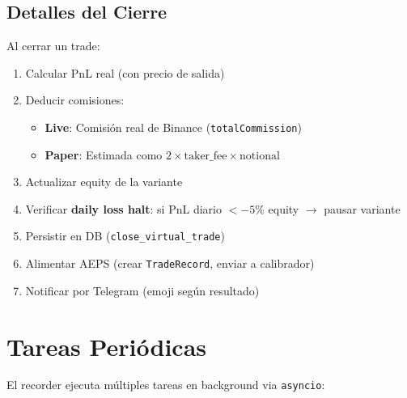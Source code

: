 \documentclass[11pt,a4paper]{article}
\newcommand{\code}[1]{\texttt{\small #1}}
\begin{document}
\subsection{Detalles del Cierre}

Al cerrar un trade:
\begin{enumerate}[leftmargin=2em]
\item Calcular PnL real (con precio de salida)
\item Deducir comisiones:
  \begin{itemize}
    \item \textbf{Live}: Comisi\'on real de Binance (\code{totalCommission})
    \item \textbf{Paper}: Estimada como $2 \times \text{taker\_fee} \times \text{notional}$
  \end{itemize}
\item Actualizar equity de la variante
\item Verificar \textbf{daily loss halt}: si PnL diario $< -5\%$ equity $\to$ pausar variante
\item Persistir en DB (\code{close\_virtual\_trade})
\item Alimentar AEPS (crear \code{TradeRecord}, enviar a calibrador)
\item Notificar por Telegram (emoji seg\'un resultado)
\end{enumerate}


\section{Tareas Peri\'odicas}
\label{sec:periodic}

El recorder ejecuta m\'ultiples tareas en background via \code{asyncio}:
\end{document}
